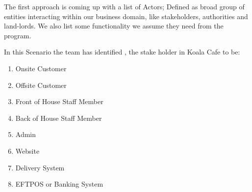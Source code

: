 \documentclass{article}
\begin{document}
The first approach is coming up with a list of Actors; Defined as broad group of entities interacting within our business domain, like stakeholders, authorities and land-lords. We also list some functionality we assume they need from the program.

In this Scenario the team has identified , the stake holder in Koala Cafe to be:


\begin{enumerate}
    \item Onsite Customer
    \item Offsite Customer
    \item Front of House Staff Member
    \item Back of House Staff Member
    \item Admin
    \item Website
    \item Delivery System
    \item EFTPOS or Banking System
\end{enumerate}

\end{document}
